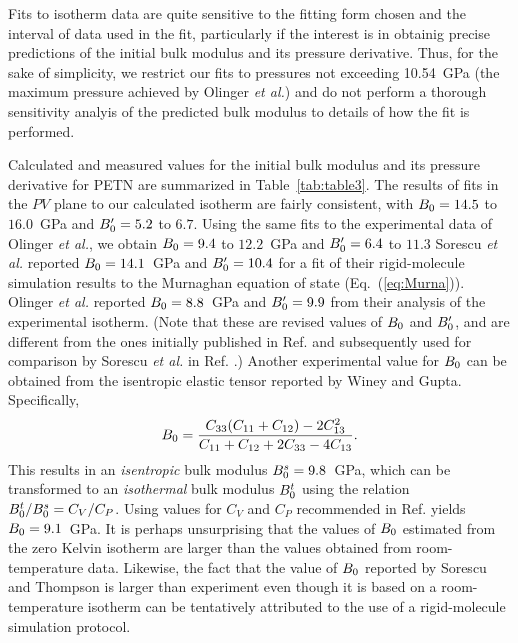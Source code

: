 \documentclass[prb,aps,nobibnotes,twocolumn,doublespace,twocolumngrid,superbib]{revtex4}
\begin{document}
Fits to isotherm data are quite sensitive to the fitting form chosen
and the interval of data used in the fit, particularly if the interest
is in obtainig precise predictions of the initial bulk modulus and
its pressure derivative.  Thus, for the sake of simplicity,
we restrict our fits to pressures %
not exceeding 10.54~GPa (the maximum pressure achieved by Olinger {\it et
al.}\cite{Olinger_1975v62})
and do not perform a thorough sensitivity analyis of the
predicted bulk modulus to details of how the fit is performed.

Calculated and measured values for the initial bulk modulus and its 
pressure derivative for PETN are summarized in Table~\ref{tab:table3}.  
The results of fits in the $PV$ plane to our calculated isotherm are fairly 
consistent, with $B_0=14.5$ to $16.0$~GPa and ${B'_0}=5.2$ to $6.7$.  
Using the same fits to the experimental data 
of Olinger {\it et al.}\cite{Olinger_1975v62}, 
we obtain $B_0=9.4$ to $12.2$~GPa and ${B'_0}=6.4$ to $11.3$
Sorescu
{\it et al.}\cite{Sorescu_1999v103}  
reported $B_0=14.1$~GPa and ${B'_0}=10.4 $ for a fit of their
rigid-molecule simulation results to the Murnaghan equation of state 
(Eq.~(\ref{eq:Murna})). 
Olinger {\it et al.}\cite{Olinger_1976} reported $B_0=8.8$~GPa 
and ${B'_0}=9.9$ from their
analysis of the experimental isotherm.  (Note that these
are revised values of $B_0$ and ${B'_0}$, and are different from the 
ones initially published in Ref. \cite{Olinger_1975v62} and subsequently
used for comparison by 
Sorescu {\it et al.}\/ in Ref. \cite{Sorescu_1999v103}.)  Another experimental 
value for $B_0$
can be obtained from the isentropic elastic tensor reported by Winey and 
Gupta\cite{Winey_2001v90}.  Specifically, 
\begin{equation}
B_0=\frac{C_{33}(C_{11}+C_{12})-2C_{13}^2}{C_{11}+C_{12}+2C_{33}-4C_{13}}.
\end{equation}
This results in an {\em isentropic} bulk modulus $B_0^{s}=9.8$~GPa, which can 
be transformed to an {\em isothermal} bulk modulus $B_0^t$ using the relation 
$B_0^t/B_0^s=C_V/C_P$.  Using values for $C_V$ and $C_P$ recommended in Ref. 
\cite{Olinger_1976}  yields $B_0=9.1$~GPa. It is perhaps unsurprising that the values
of $B_0$ estimated from the zero Kelvin isotherm are larger than the values
obtained from room-temperature data.  Likewise, the fact that the value
of $B_0$ reported by Sorescu and Thompson is larger than experiment even
though it is based on a room-temperature isotherm can be tentatively 
attributed to the use of a rigid-molecule simulation protocol.
\end{document}
